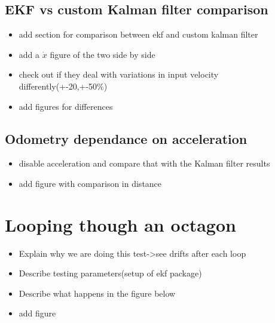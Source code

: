 \subsection{EKF vs custom Kalman filter comparison}\label{subsec:ekfvscustom}
\begin{itemize}
 \item add section for comparison between ekf and custom kalman filter
 \item add a $\dot{x}$ figure of the two side by side
 \item check out if they deal with variations in input velocity differently(+-20,+-50\%)
 \item add figures for differences
\end{itemize}

\subsection{Odometry dependance on acceleration}\label{subsec:odomdepaccel}
\begin{itemize}
 \item disable acceleration and compare that with the Kalman filter results
 \item add figure with comparison in distance
\end{itemize}

\section{Looping though an octagon}\label{sec:octagon}

\begin{itemize}
 \item Explain why we are doing this test->see drifts after each loop
 \item Describe testing parameters(setup of ekf package)
 \item Describe what happens in the figure below
 \item add figure
\end{itemize}
